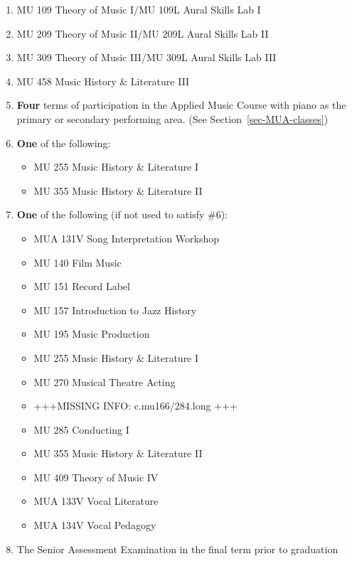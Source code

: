 \documentclass[
  letterpaper,
]{scrbook}
\providecommand{\tightlist}{%
  \setlength{\itemsep}{0pt}\setlength{\parskip}{0pt}}
\begin{document}
\begin{enumerate}
\def\labelenumi{\arabic{enumi}.}
\tightlist
\item
  MU 109 Theory of Music I/MU 109L Aural Skills Lab I
\item
  MU 209 Theory of Music II/MU 209L Aural Skills Lab II
\item
  MU 309 Theory of Music III/MU 309L Aural Skills Lab III
\item
  MU 458 Music History \& Literature III
\item
  \textbf{Four} terms of participation in the Applied Music Course with
  piano as the primary or secondary performing area. (See
  Section~\ref{sec-MUA-classes})
\item
  \textbf{One} of the following:

  \begin{itemize}
  \tightlist
  \item
    MU 255 Music History \& Literature I
  \item
    MU 355 Music History \& Literature II
  \end{itemize}
\item
  \textbf{One} of the following (if not used to satisfy \#6):

  \begin{itemize}
  \tightlist
  \item
    MUA 131V Song Interpretation Workshop
  \item
    MU 140 Film Music
  \item
    MU 151 Record Label
  \item
    MU 157 Introduction to Jazz History
  \item
    MU 195 Music Production
  \item
    MU 255 Music History \& Literature I
  \item
    MU 270 Musical Theatre Acting
  \item
    +++MISSING INFO: c.mu166/284.long +++
  \item
    MU 285 Conducting I
  \item
    MU 355 Music History \& Literature II
  \item
    MU 409 Theory of Music IV
  \item
    MUA 133V Vocal Literature
  \item
    MUA 134V Vocal Pedagogy
  \end{itemize}
\item
  The Senior Assessment Examination in the final term prior to
  graduation
\end{enumerate}
\end{document}
